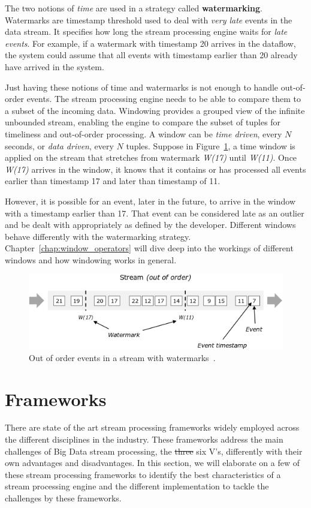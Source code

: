 The two notions of \emph{time} are used in a strategy called \textbf{watermarking}. 
Watermarks are timestamp threshold used to deal with \emph{very late} events 
in the data stream. It specifies how long the stream processing engine 
waits for \emph{late events}. For example, if a watermark with timestamp 
20 arrives in the dataflow, the system could assume that all events 
with timestamp earlier than 20 already have arrived in the system. 

Just having these notions of time and watermarks is not enough to 
handle out-of-order events. The stream processing engine needs to be able to compare them to a subset of the 
incoming data. Windowing provides a grouped view of the infinite unbounded stream, 
enabling the engine to compare the subset of tuples for timeliness and out-of-order 
processing. A window can be \emph{time driven}, every $N$ seconds, or \emph{data driven}, 
every $N$ tuples. 
Suppose in Figure~\ref{fig:watermark}, a time window is applied on the stream that
stretches from watermark \emph{W(17)} until \emph{W(11)}. 
Once \emph{W(17)} arrives in the window, it knows that it contains or has 
processed all events earlier than timestamp 17 and later than timestamp of 11.  

However, it is possible for an event, later in the future, to arrive in the window 
with a timestamp earlier than 17. That event can be considered late as an outlier and 
be dealt with appropriately as defined by the developer. Different windows 
behave differently with the watermarking strategy. Chapter~\ref{chap:window_operators}
will dive deep into the workings of different windows and how windowing works in 
general. 


\begin{figure}[htpb]
    \centering
    \includegraphics[width=0.8\linewidth]{fig/stream_watermark_out_of_order.png}
    \caption{Out of order events in a stream with watermarks~\cite{watermark_flink}.}
    \label{fig:watermark}
\end{figure}


\section{Frameworks}
\label{sec:frameworks}
There are state of the art stream processing frameworks widely employed across the 
different disciplines in the industry. These frameworks address the main challenges of 
Big Data stream processing, the \sout{three} six V's, differently with their own advantages and 
disadvantages.
In this section, we will elaborate 
on a few of these stream processing frameworks to identify the best characteristics of a 
stream processing engine and the different implementation to tackle the challenges by these 
frameworks.



